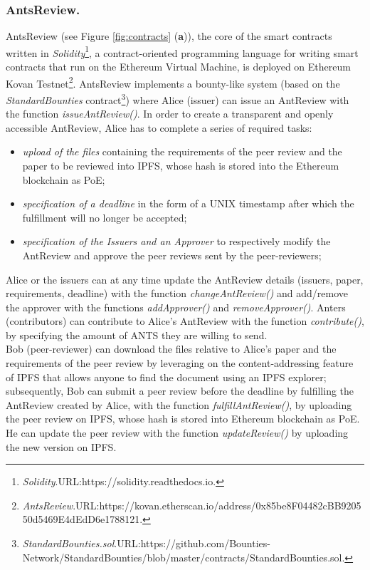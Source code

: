 \documentclass[runningheads]{llncs}
\begin{document}
\subsubsection{AntsReview.}
AntsReview (see Figure \ref{fig:contracts} (\textbf{a})), the core of the smart contracts written in \emph{Solidity}\footnote[7]{\emph{Solidity}.\textsc{URL:}https://solidity.readthedocs.io.}, a contract-oriented programming language for writing smart contracts that run on the Ethereum Virtual Machine, is deployed on Ethereum Kovan Testnet\footnote[8]{\emph{AntsReview}.\textsc{URL:}\newline https://kovan.etherscan.io/address/0x85be8F04482cBB920550d5469E4dEdD6e1788121.}. AntsReview implements a bounty-like system (based on the \emph{StandardBounties} contract\footnote[9]{\emph{StandardBounties.sol}.\textsc{URL:}https://github.com/Bounties-Network/StandardBounties/blob/master/contracts/StandardBounties.sol.}) where Alice (issuer) can issue an AntReview with the function \emph{issueAntReview()}.
\newline In order to create a transparent and openly accessible AntReview, Alice has to complete a series of required tasks:
 \begin{itemize}
     \item \emph{upload of the files} containing the requirements of the peer review and the paper to be reviewed into IPFS, whose hash is stored into the Ethereum blockchain as PoE;
     \item \emph{specification of a deadline} in the form of a UNIX timestamp after which the fulfillment will no longer be accepted;
     \item \emph{specification of the Issuers and an Approver} to respectively modify the AntReview and approve the peer reviews sent by the peer-reviewers;
\end{itemize}
 Alice or the issuers can at any time update the AntReview details (issuers, paper, requirements, deadline) with the function \emph{changeAntReview()} and add/remove the approver with the functions \emph{addApprover()} and \emph{removeApprover()}.
 Anters (contributors) can contribute to Alice's AntReview with the function \emph{contribute()}, by specifying the amount of ANTS they are willing to send. 
\\
Bob (peer-reviewer) can download the files relative to Alice's paper and the requirements of the peer review by leveraging on the content-addressing feature of IPFS that allows anyone to find the document using an IPFS explorer; subsequently, Bob can submit a peer review before the deadline by fulfilling the AntReview created by Alice, with the function \emph{fulfillAntReview()}, by uploading the peer review on IPFS, whose hash is stored into Ethereum blockchain as PoE. He can update the peer review with the function \emph{updateReview()} by uploading the new version on IPFS. 
\end{document}
